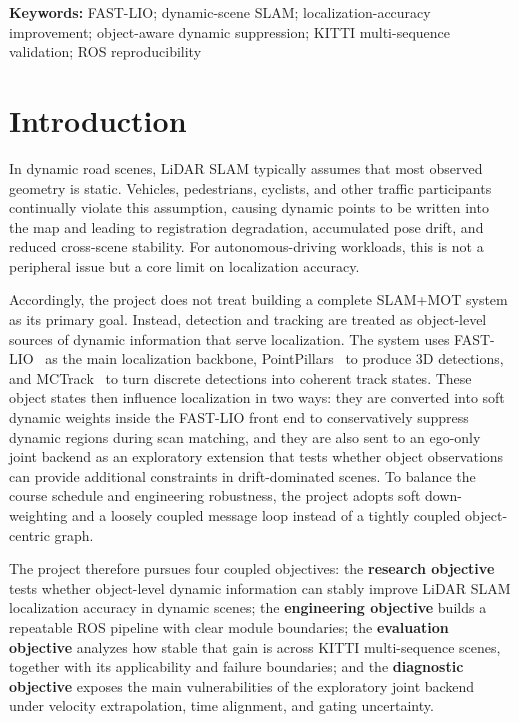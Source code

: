 \documentclass[a4paper,12pt]{article}
\begin{document}
\noindent\textbf{Keywords:} FAST-LIO; dynamic-scene SLAM; localization-accuracy improvement; object-aware dynamic suppression; KITTI multi-sequence validation; ROS reproducibility

\section{Introduction}
In dynamic road scenes, LiDAR SLAM typically assumes that most observed geometry is static. Vehicles, pedestrians, cyclists, and other traffic participants continually violate this assumption, causing dynamic points to be written into the map and leading to registration degradation, accumulated pose drift, and reduced cross-scene stability. For autonomous-driving workloads, this is not a peripheral issue but a core limit on localization accuracy.

Accordingly, the project does not treat building a complete SLAM+MOT system as its primary goal. Instead, detection and tracking are treated as object-level sources of dynamic information that serve localization. The system uses FAST-LIO~\cite{fastlio2} as the main localization backbone, PointPillars~\cite{pointpillars} to produce 3D detections, and MCTrack~\cite{mctrack} to turn discrete detections into coherent track states. These object states then influence localization in two ways: they are converted into soft dynamic weights inside the FAST-LIO front end to conservatively suppress dynamic regions during scan matching, and they are also sent to an ego-only joint backend as an exploratory extension that tests whether object observations can provide additional constraints in drift-dominated scenes. To balance the course schedule and engineering robustness, the project adopts soft down-weighting and a loosely coupled message loop instead of a tightly coupled object-centric graph.

The project therefore pursues four coupled objectives: the \textbf{research objective} tests whether object-level dynamic information can stably improve LiDAR SLAM localization accuracy in dynamic scenes; the \textbf{engineering objective} builds a repeatable ROS pipeline with clear module boundaries; the \textbf{evaluation objective} analyzes how stable that gain is across KITTI multi-sequence scenes, together with its applicability and failure boundaries; and the \textbf{diagnostic objective} exposes the main vulnerabilities of the exploratory joint backend under velocity extrapolation, time alignment, and gating uncertainty.
\end{document}

